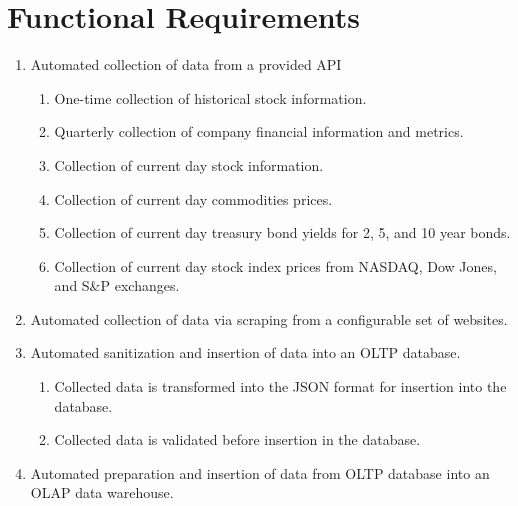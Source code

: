 \section{Functional Requirements}
\begin{enumerate}
   \item Automated collection of data from a provided API
     \begin{enumerate}
       \item One-time collection of historical stock information.
       \item Quarterly collection of company financial information and metrics.
       \item Collection of current day stock information.
       \item Collection of current day commodities prices.
       \item Collection of current day treasury bond yields for 2, 5, and 10 year bonds.
       \item Collection of current day stock index prices from NASDAQ, Dow Jones, and S\&P exchanges.
      \end{enumerate}
  \item Automated collection of data via scraping from a configurable set of websites.
  \item Automated sanitization and insertion of data into an OLTP database.
    \begin{enumerate}
       \item Collected data is transformed into the JSON format for insertion into the database.
       \item Collected data is validated before insertion in the database.
     \end{enumerate}
  \item Automated preparation and insertion of data from OLTP database into an OLAP data warehouse.
 \end{enumerate}
